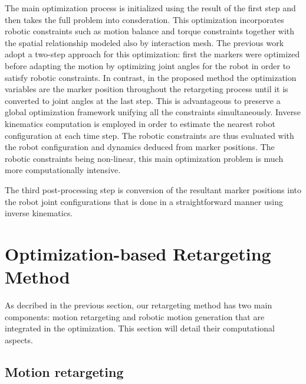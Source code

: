 \documentclass[letterpaper, 10 pt, conference]{ieeeconf}  %
\begin{document}
The main optimization process is initialized using the result of the 
first step and then takes the full problem into consderation. 
This optimization incorporates robotic constraints such as
motion balance and torque constraints together with the spatial
relationship modeled also by interaction mesh.
The previous work \cite{Nakaoka12Humanoids} adopt a two-step approach
for this optimization:
first the markers were optimized before adapting the motion by
optimizing joint angles for the robot in order to satisfy robotic
constraints.  
In contrast, in the proposed method the
optimization variables are the marker position throughout the
retargeting process until it is converted to joint angles at the last
step.
This is advantageous to preserve a global optimization framework
unifying all the constraints simultaneously. 
Inverse  kinematics computation is employed in order to estimate the
nearest robot configuration at each time step. The robotic
constraints are thus evaluated with the robot configuration and
dynamics deduced from marker positions. 
The robotic constraints being non-linear, this main
optimization problem is much more computationally intensive.

The third post-processing step is conversion of the resultant marker
positions into the robot joint configurations that is done in a
straightforward manner using inverse kinematics.  


\section{Optimization-based Retargeting Method}
\label{sec:retargeting}

As decribed in the previous section, our retargeting method has two
main components: motion retargeting and robotic motion generation that
are integrated in the optimization. This section will detail
their computational aspects.

\subsection{Motion retargeting}
\end{document}
